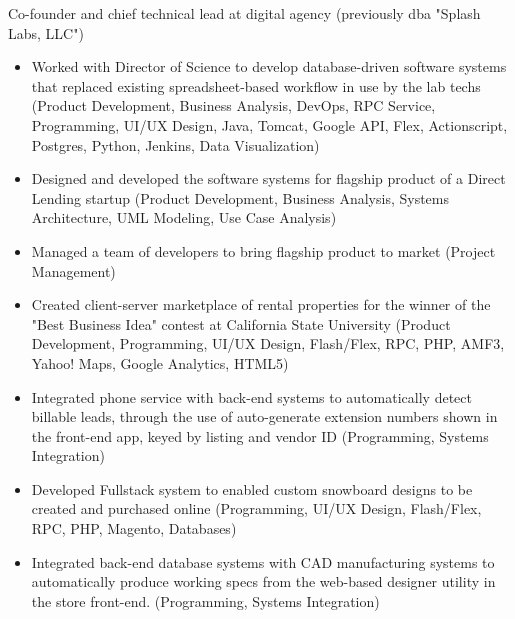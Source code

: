 \divider



Co-founder and chief technical lead at digital agency (previously dba "Splash Labs, LLC")

\begin{itemize}
  \item Worked with Director of Science to develop database-driven software systems that replaced existing spreadsheet-based workflow in use by the lab techs {\tiny (Product Development, Business Analysis, DevOps, RPC Service, Programming, UI/UX Design, Java, Tomcat, Google API, Flex, Actionscript, Postgres, Python, Jenkins, Data Visualization)}
\end{itemize}

\begin{itemize}
  \item Designed and developed the software systems for flagship product of a Direct Lending startup {\tiny (Product Development, Business Analysis, Systems Architecture, UML Modeling, Use Case Analysis)}
  \item Managed a team of developers to bring flagship product to market {\tiny (Project Management)}
\end{itemize}

\begin{itemize}
  \item Created client-server marketplace of rental properties for the winner of the "Best Business Idea" contest at California State University {\tiny (Product Development, Programming, UI/UX Design, Flash/Flex, RPC, PHP, AMF3, Yahoo! Maps, Google Analytics, HTML5)}
  \item Integrated phone service with back-end systems to automatically detect billable leads, through the use of auto-generate extension numbers shown in the front-end app, keyed by listing and vendor ID {\tiny (Programming, Systems Integration)}
\end{itemize}

\begin{itemize}
  \item Developed Fullstack system to enabled custom snowboard designs to be created and purchased online {\tiny (Programming, UI/UX Design, Flash/Flex, RPC, PHP, Magento, Databases)}
  \item Integrated back-end database systems with CAD manufacturing systems to automatically produce working specs from the web-based designer utility in the store front-end. {\tiny (Programming, Systems Integration)}
\end{itemize}

